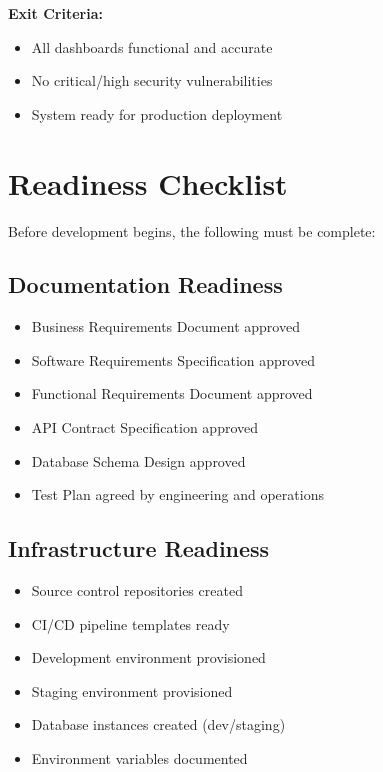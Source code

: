 \documentclass[11pt,a4paper]{article}
\begin{document}
\textbf{Exit Criteria:}
\begin{itemize}
    \item All dashboards functional and accurate
    \item No critical/high security vulnerabilities
    \item System ready for production deployment
\end{itemize}

\section{Readiness Checklist}

Before development begins, the following must be complete:

\subsection{Documentation Readiness}
\begin{itemize}
    \item[$\square$] Business Requirements Document approved
    \item[$\square$] Software Requirements Specification approved
    \item[$\square$] Functional Requirements Document approved
    \item[$\square$] API Contract Specification approved
    \item[$\square$] Database Schema Design approved
    \item[$\square$] Test Plan agreed by engineering and operations
\end{itemize}

\subsection{Infrastructure Readiness}
\begin{itemize}
    \item[$\square$] Source control repositories created
    \item[$\square$] CI/CD pipeline templates ready
    \item[$\square$] Development environment provisioned
    \item[$\square$] Staging environment provisioned
    \item[$\square$] Database instances created (dev/staging)
    \item[$\square$] Environment variables documented
\end{itemize}
\end{document}
